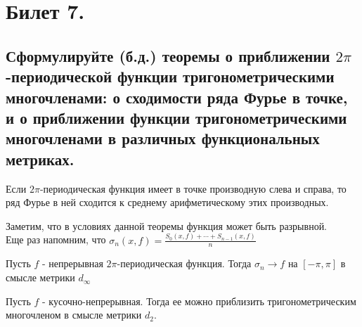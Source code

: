 \section{Билет 7.}

\subsection{Сформулируйте (б.д.) теоремы о приближении $2\pi$-периодической функции тригонометрическими многочленами: о сходимости ряда Фурье в точке, и о приближении функции тригонометрическими многочленами в различных функциональных метриках.}

\begin{theorem} 
    Если $2\pi$-периодическая функция имеет в точке производную слева и справа, то ряд Фурье в ней сходится к среднему арифметическому этих производных.
\end{theorem}

Заметим, что в условиях данной теоремы функция может быть разрывной.\\

Еще раз напомним, что $\sigma_n(x,f)=\frac{S_0(x, f)+\cdots+S_{n-1}(x, f)}{n}$

\begin{theorem} 
    Пусть $f$ - непрерывная $2\pi$-периодическая функция. Тогда $\sigma_n \rightarrow f$ на $[-\pi, \pi]$ в смысле метрики $d_{\infty}$
\end{theorem}

\begin{theorem} 
    Пусть $f$ - кусочно-непрерывная. Тогда ее можно приблизить тригонометрическим многочленом в смысле метрики $d_2$.
\end{theorem}
